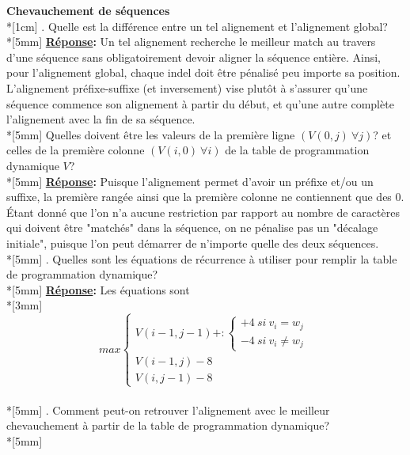 \documentclass[11pt, letterpaper]{article}
\begin{document}
\par{
\textbf{Chevauchement de séquences} \\*[1cm]
. Quelle est la différence entre un tel alignement et l'alignement global? \\*[5mm]
\textbf{\underline{Réponse}:} Un tel alignement recherche le meilleur match au travers d'une séquence sans obligatoirement devoir aligner la séquence entière. Ainsi, pour l'alignement global, chaque indel doit être pénalisé peu importe sa position. L'alignement préfixe-suffixe (et inversement) vise plutôt à s'assurer qu'une séquence commence son alignement à partir du début, et qu'une autre complète l'alignement avec la fin de sa séquence. \\*[5mm] Quelles doivent être les valeurs de la première ligne $(V(0,j) \ \forall j)$? et celles de la première colonne $(V(i,0) \ \forall i)$ de la table de programmation dynamique $V$? \\*[5mm]
\textbf{\underline{Réponse}:} Puisque l'alignement permet d'avoir un préfixe et/ou un suffixe, la première rangée ainsi que la première colonne ne contiennent que des 0. Étant donné que l'on n'a aucune restriction par rapport au nombre de caractères qui doivent être "matchés" dans la séquence, on ne pénalise pas un "décalage initiale", puisque l'on peut démarrer de n'importe quelle des deux séquences. \\*[5mm]
. Quelles sont les équations de récurrence à utiliser pour remplir la table de programmation dynamique? \\*[5mm]
\textbf{\underline{Réponse}:} Les équations sont \\*[3mm]
\center
\begin{equation}
	max \begin{cases}
	V(i-1,j-1) + : \begin{cases}
									+4 \ si \ v_i = w_j \\
									-4 \ si \ v_i \neq w_j
									\end{cases} \\
	V(i-1,j) - 8 \\
	V(i,j-1) - 8
	\end{cases}
\end{equation} \\*[5mm]
\flushleft
{}. Comment peut-on retrouver l'alignement avec le meilleur chevauchement à partir de la table de programmation dynamique? \\*[5mm]
}
\end{document}
